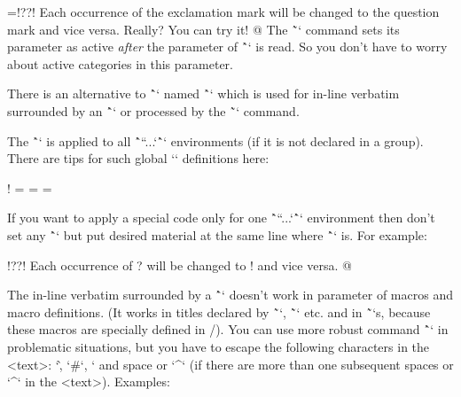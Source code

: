 \begtt \adef@{\string\endtt}
\everytt={\adef!{?}\adef?{!}}
\begtt
Each occurrence of the exclamation mark will be changed to
the question mark and vice versa. Really? You can try it!
@
\endtt
%
The \~`\adef` command sets its parameter as active {\it after\/}
the parameter of \^`\everytt` is read. So you don't have to worry about active
categories in this parameter.

There is an alternative to \^`\everytt` named \^`\everyintt` which is used for
in-line verbatim surrounded by an \^`\verbchar` or processed by the \~`\code`
command.

The \^`\everytt` is applied to all \^`\begtt``...`\^`\endtt` environments (if it is not
declared in a group). There are tips for such global `\everytt` definitions here:

\begtt \adef!{ }
\everytt={\typosize[9/11]}  %
\everytt={}        %
\everytt={\visiblesp}       %
\endtt

\new
If you want to apply a special code only for one \^`\begtt``...`\^`\endtt`
environment then don't set any \^`\everytt` but put desired material at the
same line where \^`\begtt` is. For example:

\begtt   \adef@{\string\endtt}
\begtt   \adef!{?}\adef?{!}
Each occurrence of ? will be changed to ! and vice versa.
@
\endtt

The in-line verbatim surrounded by a \^`\verbchar` doesn't work in
parameter of macros and macro definitions. (It works in titles declared by
\~`\chap`, \~`\sec` etc. and in \~`\fnote`s, because these macros are
specially defined in \OpTeX/).
\new
You can use more robust command \^`` in problematic
situations, but you have to escape the following characters in the <text>:
`\`, `#`, `%
and space or `^` (if there are more than one subsequent spaces or `^` in
the <text>). Examples:

